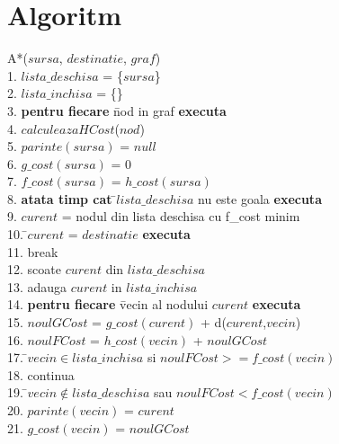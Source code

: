 \documentclass{article}
\begin{document}
\section{Algoritm}
\begin{tabbing}
A*($sursa$, $destinatie$, $graf$) \\
1. $lista\_deschisa$ = \{$sursa$\} \\
2. $lista\_inchisa$ = \{\} \\
3. {\bf pentru fiecare} \=nod in graf {\bf executa}\\
4.                        \> $calculeazaHCost$($nod$) \\
5. $parinte(sursa)$ = $null$ \\
6. $g\_cost(sursa)$ = 0 \\
7. $f\_cost(sursa)$ = $h\_cost(sursa)$ \\
8. {\bf atata timp cat} \=$lista\_deschisa$ nu este goala {\bf executa}\\
9.                       \>$curent$ = nodul din lista deschisa cu f\_cost minim \\
10.                       \=$curent$ = $destinatie$ {\bf executa}\\
11.                      \>             \>break \\
12.                      \> scoate $curent$ din $lista\_deschisa$ \\
13.                      \> adauga $curent$ in $lista\_inchisa$ \\
14.                      \> {\bf pentru fiecare} \=vecin al nodului $curent$ {\bf executa} \\
15.                      \>                        \>$noulGCost$ = $g\_cost(curent)$ + d($curent$,$vecin$)\\
16.                      \>                        \>$noulFCost$ = $h\_cost(vecin)$ + $noulGCost$ \\
17.                      \>                         \=$vecin \in lista\_inchisa$ si $noulFCost>=f\_cost(vecin)$  \\
18.                      \>                        \>             \>continua \\
19.                      \>                         \=$vecin \notin lista\_deschisa$ sau $noulFCost<f\_cost(vecin)$ \\
20.                      \>                        \>                    \>$parinte(vecin)$ = $curent$ \\
21.                      \>                        \>                    \>$g\_cost(vecin)$ = $noulGCost$\\

\end{tabbing}
\end{document}
